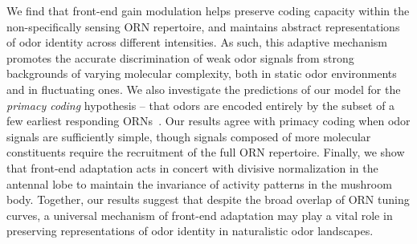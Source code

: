 We find that front-end gain modulation helps preserve coding capacity within the non-specifically sensing ORN repertoire, and maintains abstract representations of odor identity across different intensities. As such, this adaptive mechanism promotes the  accurate  discrimination of weak odor signals from strong backgrounds of varying molecular complexity, both in static odor environments  and in fluctuating ones. We also investigate the predictions of our model for the \textit{primacy coding} hypothesis  -- that odors are encoded entirely by the subset of a few earliest responding ORNs~\cite{primacy_coding, primacy_math}. Our results agree with primacy coding when odor signals are sufficiently  simple, though signals composed of more molecular constituents require the recruitment of the full ORN repertoire. Finally, we show that front-end adaptation acts in concert with divisive normalization in the antennal lobe to maintain the invariance of activity patterns  in the  mushroom body. Together, our results suggest that despite the broad overlap of ORN tuning curves, a universal mechanism of front-end adaptation may play a vital role in preserving representations of odor identity in naturalistic odor landscapes.



